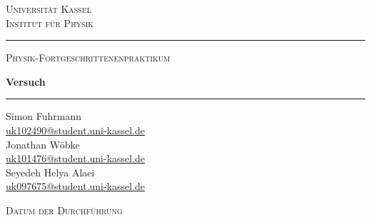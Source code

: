 



\begin{titlepage}
    \begin{center}

        \vspace*{1.5cm}
        {\color{gray}\footnotesize \textsc{Universität Kassel}\\[2pt]
        \textsc{Institut für Physik}\par}
        \vspace{0.8cm}

        {\color{gray}\rule{0.6\textwidth}{0.4pt}}

        \vspace{1.2cm}
        {\Large\scshape Physik-Fortgeschrittenenpraktikum\par}
        \vspace{0.9cm}

        {\color{darkgray}\huge\bfseries Versuch \Versuchsnummer\par}
        \vspace{0.35cm}
        {\color{darkgray}\LARGE \Versuchstitel\par}

        \vspace{1.2cm}
        {\color{gray}\rule{0.6\textwidth}{0.4pt}}

        \vspace{1.4cm}
        {\large
        Simon Fuhrmann\\[2pt]
        \href{mailto:uk102490@student.uni-kassel.de}{\small uk102490@student.uni-kassel.de}\\[10pt]
        Jonathan Wöbke\\[2pt]
        \href{mailto:uk101476@student.uni-kassel.de}{\small uk101476@student.uni-kassel.de}\\[10pt]
        Seyedeh Helya Alaei\\[2pt]
        \href{mailto:uk097675@student.uni-kassel.de}{\small uk097675@student.uni-kassel.de}\par}

        \vfill
        {\color{gray}\footnotesize \textsc{Datum der Durchführung}\par}
        \vspace{4pt}
        {\large \Durchfuehrungsdatum\par}
        \vspace{1.2cm}

    \end{center}
\end{titlepage}
